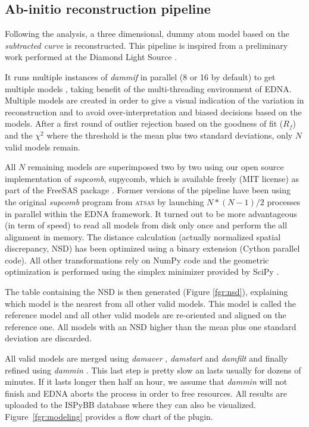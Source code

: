\documentclass[preprint,pdf]{iucr}              %
\begin{document}
\subsection{Ab-initio reconstruction pipeline}
\label{abinitio}
Following the analysis, a three dimensional, dummy atom model based
on the \textit{subtracted curve} is reconstructed.
This pipeline is inspired from a preliminary work
performed at the Diamond Light Source \cite{DiamondSE}.

It runs multiple instances of \textit{dammif} in parallel (8 or 16 by default)
to get multiple models \cite{dammif}, taking benefit of the multi-threading
environment of EDNA.
Multiple models are created in order to give a visual indication of the variation in
reconstruction and to avoid over-interpretation and biased decisions based on
the models.
After a first round of outlier rejection based on the goodness of fit ($R_{f}$)
and the $\chi^{2}$ where the threshold is the mean plus two standard
deviations, only $N$ valid models remain.

All $N$ remaining models are superimposed two by two using
our open source implementation of \textit{supcomb}, supycomb, which is available freely
(MIT license) as part of the FreeSAS package \cite{freesas}.
Former versions of the pipeline have been using the original
\textit{supcomb} \cite{supcomb} program from \textsc{atsas} by launching
$N*(N-1)/2$ processes in parallel within the EDNA framework.
It turned out to be more advantageous (in term of speed) to read all models
from disk only once and perform the all alignment in memory.
The distance calculation (actually normalized spatial discrepancy, NSD) has
been optimized using a binary extension (Cython parallel code).
All other transformations rely on NumPy \cite{numpy} code and the geometric
optimization is performed using the simplex minimizer provided by SciPy \cite{scipy}.

The table containing the NSD is then generated
(Figure \ref{fgr:nsd}), explaining which model is the nearest from all other
valid models. This model is called the reference model and all other valid
models are re-oriented and aligned on the reference one.
All models with an NSD higher than the mean plus one standard deviation are
discarded.

All valid models are merged using \textit{damaver} \cite{damaver}, \textit{damstart} and
\textit{damfilt} and finally refined using \textit{dammin} \cite{dammin}.
This last step is pretty slow an lasts usually for dozens of minutes. If it lasts longer then half an hour, we assume that \textit{dammin} will not finish and EDNA aborts the process in order to free resources. 
All results are uploaded to the ISPyBB database where they can also be
visualized. Figure~\ref{fgr:modeling} provides a flow chart of the plugin.
\end{document}

